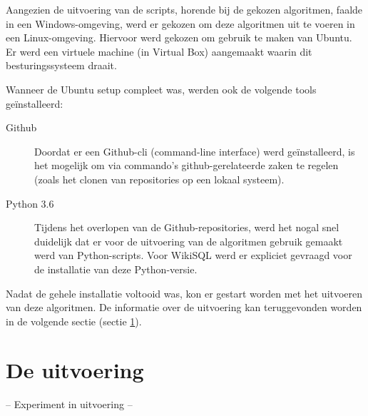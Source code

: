 Aangezien de uitvoering van de scripts, horende bij de gekozen algoritmen, faalde in een Windows-omgeving, werd er gekozen om deze algoritmen uit te voeren in een Linux-omgeving. Hiervoor werd gekozen om gebruik te maken van Ubuntu. Er werd een virtuele machine (in Virtual Box) aangemaakt waarin dit besturingssysteem draait.

Wanneer de Ubuntu setup compleet was, werden ook de volgende tools geïnstalleerd:
\begin{description}
	\item[Github] Doordat er een Github-cli (command-line interface) werd geïnstalleerd, is het mogelijk om via commando's github-gerelateerde zaken te regelen (zoals het clonen van repositories op een lokaal systeem).
	\item[Python 3.6] Tijdens het overlopen van de Github-repositories, werd het nogal snel duidelijk dat er voor de uitvoering van de algoritmen gebruik gemaakt werd van Python-scripts. Voor WikiSQL werd er expliciet gevraagd voor de installatie van deze Python-versie. 
\end{description}

Nadat de gehele installatie voltooid was, kon er gestart worden met het uitvoeren van deze algoritmen. De informatie over de uitvoering kan teruggevonden worden in de volgende sectie (sectie \ref{sec:uitvoering}).

\section{De uitvoering}
\label{sec:uitvoering}

-- Experiment in uitvoering --

\lipsum[21-25]